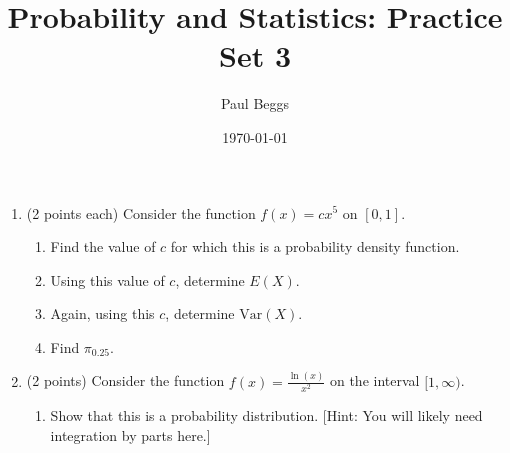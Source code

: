 \documentclass[11pt]{article}
\title{Probability and Statistics: Practice Set 3}
\author{Paul Beggs}
\date{\today}
\newenvironment{solution}
  {\textit{Solution.}}
\newcommand{\sol}[1]{
    \begin{customframedproof}[linecolor=orangehdx!75,]
        \begin{solution}
        #1
        \end{solution}
    \end{customframedproof}
}
\begin{document}
\maketitle

\begin{enumerate}
    \item (2 points each) Consider the function \(f(x) = cx^{5}\) on \([0,1]\).
    \begin{enumerate}
        \item Find the value of \(c\) for which this is a probability density function.
        \sol{
            \[
                \int_{0}^{1} cx^{5} \, dx = 1 \implies c \int_{0}^{1} x^{5} \, dx = 1 \implies c \left[ \frac{x^{6}}{6} \right]_{0}^{1} = 1 \implies c \cdot \frac{1}{6} = 1 \implies c = 6.
            \]
        }
        \item Using this value of \(c\), determine \(E(X)\).
        \sol{
            \[
                E(X) = \int_{0}^{1} x \cdot 6x^{5} \, dx = 6 \left[ \frac{x^{7}}{7} \right]_{0}^{1} = \frac{6}{7}.
            \]  
        }
        \item Again, using this \(c\), determine \(\text{Var}(X)\).
        \item Find \(\pi_{0.25}\).
    \end{enumerate}
\newpage
    \item (2 points) Consider the function \(\displaystyle f(x) = \frac{\ln(x)}{x^{2}}\) on the interval \([1, \infty)\).
    \begin{enumerate}
        \item Show that this is a probability distribution. [Hint: You will likely need integration by parts here.]

\end{enumerate}
\end{enumerate}
\end{document}
